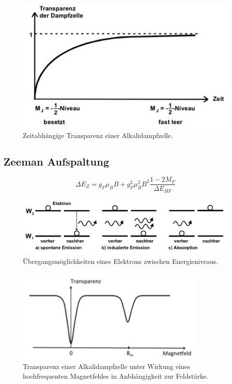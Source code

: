 \begin{figure}[H]
	\centering
	\includegraphics[width=0.6\linewidth]{content/grafik/transparenz.jpg}
	\caption{Zeitabhängige Transparenz einer Alkalidampfzelle. \cite{pumpen}}
	\label{fig:transparenz}
\end{figure}

\subsection{Zeeman Aufspaltung}

\begin{equation}
	\Delta E_Z = g_F \mu_B B + g_F^2 \mu_B^2 B^2 \frac{1 - 2M_F}{\Delta E_{HF}}
	\label{eqn:quad_zeeman}
\end{equation}

\begin{figure}[H]
	\centering
	\includegraphics[width=0.75\linewidth]{content/grafik/uebergang.jpg}
	\caption{Übergangsmöglichkeiten eines Elektrons zwischen Energieniveaus. \cite{pumpen}}
	\label{fig:uebergang}
\end{figure}

\begin{figure}[H]
	\centering
	\includegraphics[width=0.6\linewidth]{content/grafik/minima.jpg}
	\caption{Transparenz einer Alkalidampfzelle unter Wirkung eines hochfrequenten Magnetfeldes in Anbhängigkeit
			 zur Feldstärke. \cite{pumpen}}
	\label{fig:minima}
\end{figure}

